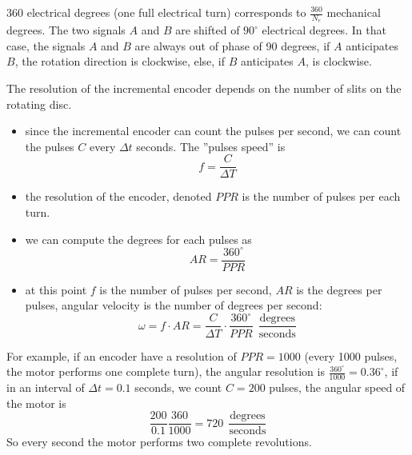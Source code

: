 \documentclass[10pt, letterpaper]{report}
\begin{document}
360 electrical degrees (one full electrical turn) corresponds to $\frac{360}{N_e}$ mechanical degrees. The two signals $A$ and $B$ are shifted of $90^\circ$ electrical degrees.
In that case, the signals $A$ and $B$ are always out of phase of 90 degrees, if $A$ anticipates $B$, the rotation direction is clockwise, else, if $B$ anticipates $A$, is clockwise.\bigskip 

The resolution of the incremental encoder depends on the number of slits on the rotating disc.\begin{itemize}
    \item since the incremental encoder can count the pulses per second, we can count the pulses $C$ every $\Delta t$ seconds. The ''pulses speed'' is $$ f=\frac{C}{\Delta T}$$
    \item the resolution of the encoder, denoted $PPR$ is the number of pulses per each turn.
    \item we can compute the degrees for each pulses as $$ AR=\frac{360^\circ}{PPR}$$
    \item at this point $f$ is the number of pulses per second, $AR$ is the degrees per pulses, angular velocity is the number of degrees per second:\begin{equation}
        \omega=f\cdot AR=\frac{C}{\Delta T}\cdot\frac{360^\circ}{PPR}\ \ \frac{\text{degrees}}{\text{seconds}}
    \end{equation}
\end{itemize}
For example, if an encoder have a resolution  of $PPR=1000$ (every 1000 pulses, the motor performs one complete turn), the angular resolution is $\frac{360^\circ}{1000}=0.36^\circ$, if in an interval of $\Delta t=0.1$ seconds, we count $C=200$ pulses, the angular speed of the motor is\begin{equation}
    \frac{200}{0.1}\frac{360}{1000}=720\ \ \frac{\text{degrees}}{\text{seconds}}
\end{equation}
So every second the motor performs two complete revolutions.
\end{document}
